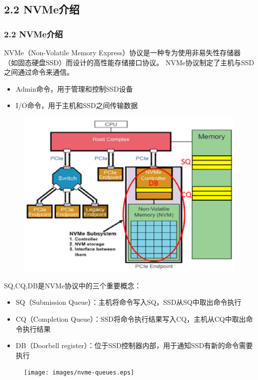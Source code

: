 \documentclass[10pt]{ctexbeamer}
\begin{document}
\subsection{2.2 NVMe介绍}\label{sec:2-2}
\begin{frame}
  \frametitle{2.2 NVMe介绍}
  NVMe（Non-Volatile Memory Express）协议是一种专为使用非易失性存储器（如固态硬盘SSD）而设计的高性能存储接口协议。
  NVMe协议制定了主机与SSD之间通过命令来通信。
  \begin{itemize}
    \item Admin命令，用于管理和控制SSD设备
    \item I/O命令，用于主机和SSD之间传输数据
  \end{itemize}
  \begin{figure}
    \includegraphics[width=.5\textwidth, height=.5\textheight, keepaspectratio]{images/nvme.eps}
  \end{figure}
\end{frame}

\begin{frame}
  SQ,CQ,DB是NVMe协议中的三个重要概念：
  \begin{itemize}
    \item SQ（Submission Queue）：主机将命令写入SQ，SSD从SQ中取出命令执行
    \item CQ（Completion Queue）：SSD将命令执行结果写入CQ，主机从CQ中取出命令执行结果
    \item DB（Doorbell register）：位于SSD控制器内部，用于通知SSD有新的命令需要执行
  \end{itemize}
  \begin{figure}
    \texttt{[image: images/nvme-queues.eps]}
  \end{figure}
\end{frame}
\end{document}
